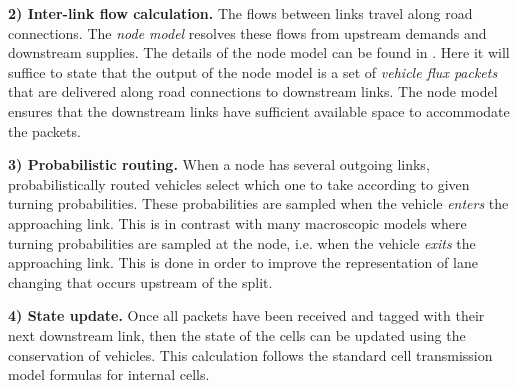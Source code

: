 \vspace{1em}\noindent \textbf{2) Inter-link flow calculation.} The flows between links travel along road connections. The \textit{node model} resolves these flows from upstream demands and downstream supplies. The details of the node model can be found in \cite{Gomes2019OTM}. Here it will suffice to state that the output of the node model is a set of \textit{vehicle flux packets} that are delivered along road connections to downstream links. The node model ensures that the downstream links have sufficient available space to accommodate the packets.  

\vspace{1em}\noindent \textbf{3) Probabilistic routing.}
When a node has several outgoing links, probabilistically routed vehicles select which one to take according to given turning probabilities. These probabilities are sampled when the vehicle \textit{enters} the approaching link. This is in contrast with many macroscopic models where turning probabilities are sampled at the node, i.e. when the vehicle \textit{exits} the approaching link. This is done in order to improve the representation of lane changing that occurs upstream of the split.

\vspace{1em} \noindent \textbf{4) State update.} Once all packets have been received and tagged with their next downstream link, then the state of the cells can be updated using the conservation of vehicles. This calculation follows the standard cell transmission model formulas for internal cells. 


